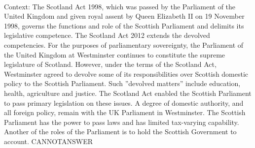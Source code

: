 \documentclass[11pt,a4paper, onecolumn]{article}
\begin{document}
\\ Context: The Scotland Act 1998, which was passed by the Parliament of the United Kingdom and given royal assent by Queen Elizabeth II on 19 November 1998, governs the functions and role of the Scottish Parliament and delimits its legislative competence. The Scotland Act 2012 extends the devolved competencies. For the purposes of parliamentary sovereignty, the Parliament of the United Kingdom at Westminster continues to constitute the supreme legislature of Scotland. However, under the terms of the Scotland Act, Westminster agreed to devolve some of its responsibilities over Scottish domestic policy to the Scottish Parliament. Such ''devolved matters'' include education, health, agriculture and justice. The Scotland Act enabled the Scottish Parliament to pass primary legislation on these issues. A degree of domestic authority, and all foreign policy, remain with the UK Parliament in Westminster. The Scottish Parliament has the power to pass laws and has limited tax-varying capability. Another of the roles of the Parliament is to hold the Scottish Government to account. CANNOTANSWER
\end{document}
